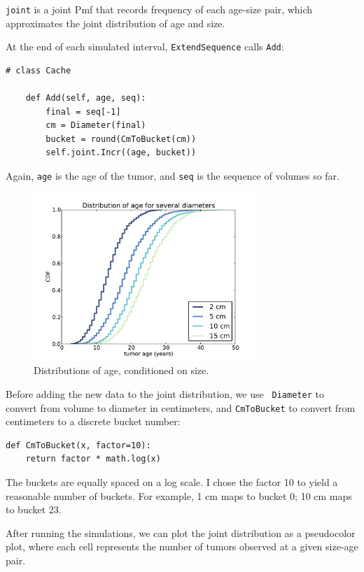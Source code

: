 \documentclass[12pt]{book}
\begin{document}
{\tt joint} is a joint Pmf that records 
frequency of each age-size pair, which approximates the
joint distribution of age and size.

At the end of each simulated interval, {\tt ExtendSequence} calls
{\tt Add}:

\begin{verbatim}
# class Cache

    def Add(self, age, seq):
        final = seq[-1]
        cm = Diameter(final)
        bucket = round(CmToBucket(cm))
        self.joint.Incr((age, bucket))
\end{verbatim}

Again, {\tt age} is the age of the tumor, and {\tt seq} is the
sequence of volumes so far.

\begin{figure}
\centerline{\includegraphics[height=2.5in]{figs/kidney6.pdf}}
\caption{Distributions of age, conditioned on size.}
\label{fig.kidney6}
\end{figure}

Before adding the new data to the joint distribution, we use {\tt
  Diameter} to convert from volume to diameter in centimeters, and
{\tt CmToBucket} to convert from centimeters to a discrete bucket
number:

\begin{verbatim}
def CmToBucket(x, factor=10):
    return factor * math.log(x)
\end{verbatim}

The buckets are equally spaced on a log scale.  I chose the
factor 10 to yield a reasonable number of buckets.  For example,
1 cm maps to bucket 0; 10 cm maps to bucket 23.

After running the simulations, we can plot the joint distribution
as a pseudocolor plot, where each cell represents the number of
tumors observed at a given size-age pair.
\end{document}
